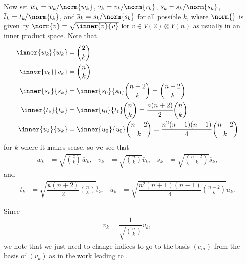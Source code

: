Now set $\overline w_k = w_k/\norm{w_k}$, $\overline v_k = v_k/\norm{v_k}$, $\overline s_k = s_k/\norm{s_k}$, $\overline t_k = t_k/\norm{t_k}$, and $\overline s_k = s_k/\norm{s_k}$ for all possible $k$, where $\norm{}$ is given by $\norm{v}=\sqrt{\inner{v}{v}}$ for $v\in V(2)\otimes V(n)$ as usually in an inner product space. Note that 
\begin{align*}
  \inner{w_k}{w_k} &= \binom{2}{k} \\
  \inner{v_k}{v_k} &= \binom{n}{k} \\
  \inner{s_k}{s_k} &= \inner{s_0}{s_0}\binom{n+2}{k} = \binom{n+2}{k} \\
  \inner{t_k}{t_k} &= \inner{t_0}{t_0}\binom{n}{k} = \dfrac{n(n+2)}{2}\binom{n}{k} \\
  \inner{u_k}{u_k} &= \inner{u_0}{u_0}\binom{n-2}{k} = \dfrac{n^2(n+1)(n-1)}{4}\binom{n-2}{k}
\end{align*}
for $k$ where it makes sense, so we see that
\begin{align}\label{eq:normedbases1}
  w_k &= \sqrt{\binom{2}{k}}\overline w_k, & v_k &= \sqrt{\binom{n}{k}}\overline v_k, & s_k &= \sqrt{\binom{n+2}{k}}\overline s_k,
\end{align}
and
\begin{align}\label{eq:normedbases2}
  t_k &= \sqrt{\dfrac{n(n+2)}{2}\binom{n}{k}}\overline t_k, & u_k &= \sqrt{\dfrac{n^2(n+1)(n-1)}{4}\binom{n-2}{k}}\overline u_k.
\end{align}

\begin{remark}\label{rem:changeindex}
  Since
  \begin{align*}
    \overline v_k = \dfrac{1}{\sqrt{\binom{n}{k}}} v_k,
  \end{align*}
  we note that we just need to change indices to go to the basis $(e_m)$ from the basis of $(v_k)$ as in the work leading to .
\end{remark}

